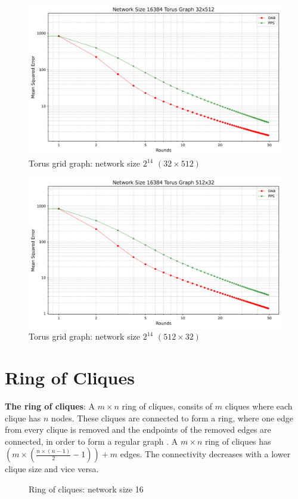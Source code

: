 \begin{figure}[H]
    \centering
    \includegraphics[scale=0.5]{figures/torusGridGraphSimulations/32x512/DAB_vs_PPS_TG_r50_n16384.png}
    \caption{Torus grid graph: network size $2^{14}$ $(32\times512)$}
    \label{fig:16384torusGraph}
\end{figure}

\begin{figure}[H]
    \centering
    \includegraphics[scale=0.5]{figures/torusGridGraphSimulations/512x32/DAB_vs_PPS_TG_r50_n16384.png}
    \caption{Torus grid graph: network size $2^{14}$ $(512\times32)$}
    \label{fig:16384torusGraph}
\end{figure}

\section{Ring of Cliques}
\textbf{The ring of cliques}: A $m \times n$ ring of cliques, consits of $m$ cliques where each clique has $n$ nodes. These cliques are connected to form a ring, where one edge from every clique is removed and the endpoints of the removed edges are connected, in order to form a regular graph \cite{Mahlmann2010}. A $m \times n$ ring of cliques has $\left( m\times \left(\frac{n\times (n - 1)}{2}-1 \right) \right) +m$ edges. The connectivity decreases with a lower clique size and vice versa.
\begin{figure}[H]
    \centering
    \scalebox{1}{}
    \caption{Ring of cliques: network size 16}
    \label{fig:ringofcliquesDemo}
\end{figure}

